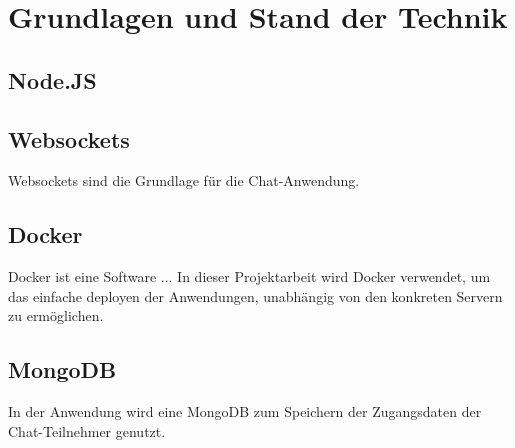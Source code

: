 
\chapter{Grundlagen und Stand der Technik}\label{cha:Grundlagen}
\section{Node.JS}\label{sec:Node.JS}

\section{Websockets}\label{sec:Websockets}
Websockets sind die Grundlage für die Chat-Anwendung.
\section{Docker}\label{sec:Docker}
Docker ist eine Software ... In dieser Projektarbeit wird Docker verwendet, um das einfache deployen der Anwendungen, unabhängig von den konkreten Servern zu ermöglichen.
\section{MongoDB}\label{sec:MongoDB}
In der Anwendung wird eine MongoDB zum Speichern der Zugangsdaten der Chat-Teilnehmer genutzt.